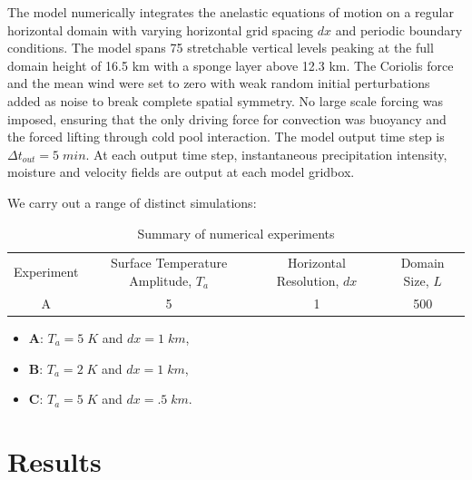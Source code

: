 \documentclass[draft,linenumbers]{agujournal2019}
\begin{document}
\noindent
The model numerically integrates the anelastic equations of motion on a regular horizontal domain with varying horizontal grid spacing $dx$ and periodic boundary conditions. 
The model spans 75 stretchable vertical levels peaking at the full domain height of 16.5 km with a sponge layer above 12.3 km.
The Coriolis force and the mean wind were set to zero with weak random initial perturbations added as noise to break complete spatial symmetry. 
No large scale forcing was imposed,
ensuring that the only driving force for convection was buoyancy and the forced lifting through cold pool interaction.
The model output time step is $\Delta t_{out}=5\;min$. 
At each output time step, instantaneous precipitation intensity, moisture and velocity fields are output at each model gridbox. 

We carry out a range of distinct simulations:
\begin{table}
    \centering
    \begin{tabular}{c|c|c|c}
        Experiment & Surface Temperature Amplitude, $T_a$ & Horizontal Resolution, $dx$ & Domain Size, $L$\\
        A & 5 & 1 & 500\\
    \end{tabular}
    \caption{Summary of numerical experiments}
    \label{tab:experiments_overview}
\end{table}

\begin{itemize}
    \item {\bf A}: $T_a=5\;K$ and $dx=1\;km$,
    \item {\bf B}: $T_a=2\;K$ and $dx=1\;km$,
    \item {\bf C}: $T_a=5\;K$ and $dx=.5\;km$.
\end{itemize}


\section{Results}\label{sec:results}
\end{document}
